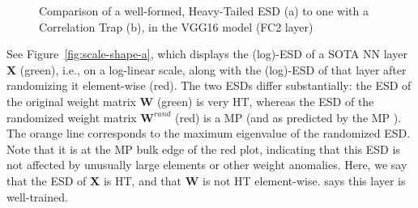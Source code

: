 \begin{figure}[h]
    \centering
    \caption{Comparison of a well-formed, Heavy-Tailed ESD (a) to one with a Correlation Trap (b), in the VGG16 model (FC2 layer)}
  \label{fig:scale-shape}                                                                                                      
\end{figure}

See Figure~\ref{fig:scale-shape-a}, which displays the (log)-ESD of a \Typical SOTA NN layer $\mathbf{X}$ (green), i.e., on a log-linear scale, along with the (log)-ESD of that layer after randomizing it element-wise (red).
The two ESDs differ substantially:
the ESD of the original weight matrix  $\mathbf{W}$ (green) is very HT, whereas 
the ESD of the randomized weight matrix  $\mathbf{W}^{rand}$ (red) is a MP (and as predicted by the MP \RMT).
The orange line corresponds to the maximum eigenvalue of the randomized ESD.
Note that it is at the MP bulk edge of the red plot, indicating that this ESD is not affected by unusually large elements or other weight anomalies.
Here, we say that the ESD of $\mathbf{X}$ is HT, and that $\mathbf{W}$ is not HT element-wise.
\HTSR says this layer is well-trained.

